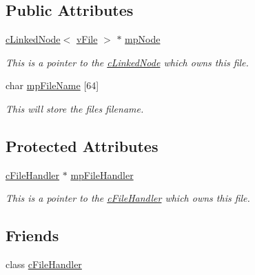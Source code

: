 \subsection*{Public Attributes}
\begin{DoxyCompactItemize}
\item 
\hypertarget{classc_file_aed51bea596b50e6c8a03dd1593298681}{
\hyperlink{classc_linked_node}{cLinkedNode}$<$ \hyperlink{classv_file}{vFile} $>$ $\ast$ \hyperlink{classc_file_aed51bea596b50e6c8a03dd1593298681}{mpNode}}
\label{classc_file_aed51bea596b50e6c8a03dd1593298681}

\begin{DoxyCompactList}\small\item\em This is a pointer to the \hyperlink{classc_linked_node}{cLinkedNode} which owns this file. \end{DoxyCompactList}\item 
\hypertarget{classc_file_a5e3add41cacddcc489ca9aa185e3b066}{
char \hyperlink{classc_file_a5e3add41cacddcc489ca9aa185e3b066}{mpFileName} \mbox{[}64\mbox{]}}
\label{classc_file_a5e3add41cacddcc489ca9aa185e3b066}

\begin{DoxyCompactList}\small\item\em This will store the files filename. \end{DoxyCompactList}\end{DoxyCompactItemize}
\subsection*{Protected Attributes}
\begin{DoxyCompactItemize}
\item 
\hypertarget{classc_file_ae54eca20c29d2fcd5649aac33d1dba9a}{
\hyperlink{classc_file_handler}{cFileHandler} $\ast$ \hyperlink{classc_file_ae54eca20c29d2fcd5649aac33d1dba9a}{mpFileHandler}}
\label{classc_file_ae54eca20c29d2fcd5649aac33d1dba9a}

\begin{DoxyCompactList}\small\item\em This is a pointer to the \hyperlink{classc_file_handler}{cFileHandler} which owns this file. \end{DoxyCompactList}\end{DoxyCompactItemize}
\subsection*{Friends}
\begin{DoxyCompactItemize}
\item 
\hypertarget{classc_file_a70d0eacda2243b6345feb400aef70378}{
class \hyperlink{classc_file_a70d0eacda2243b6345feb400aef70378}{cFileHandler}}
\label{classc_file_a70d0eacda2243b6345feb400aef70378}

\end{DoxyCompactItemize}


